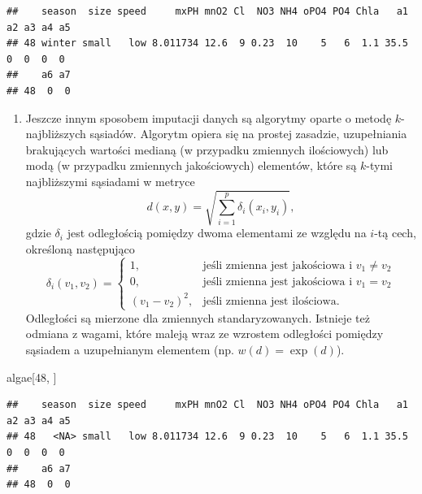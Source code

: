 \documentclass[
]{book}
\newenvironment{Shaded}{\begin{snugshade}}{\end{snugshade}}
\newcommand{\DecValTok}[1]{\textcolor[rgb]{0.00,0.00,0.81}{#1}}
\newcommand{\NormalTok}[1]{#1}
\providecommand{\tightlist}{%
  \setlength{\itemsep}{0pt}\setlength{\parskip}{0pt}}
\theoremstyle{plain}
\theoremstyle{definition}
\theoremstyle{definition}
\theoremstyle{definition}
\theoremstyle{definition}
\theoremstyle{definition}
\theoremstyle{remark}
\begin{document}
\begin{verbatim}
##    season  size speed     mxPH mnO2 Cl  NO3 NH4 oPO4 PO4 Chla   a1 a2 a3 a4 a5
## 48 winter small   low 8.011734 12.6  9 0.23  10    5   6  1.1 35.5  0  0  0  0
##    a6 a7
## 48  0  0
\end{verbatim}

\begin{enumerate}
\def\labelenumi{\arabic{enumi}.}
\setcounter{enumi}{3}
\tightlist
\item
  Jeszcze innym sposobem imputacji danych są algorytmy oparte o metodę \(k\)-najbliższych sąsiadów. Algorytm opiera się na prostej zasadzie, uzupełniania brakujących wartości medianą (w przypadku zmiennych ilościowych) lub modą (w przypadku zmiennych jakościowych) elementów, które są \(k\)-tymi najbliższymi sąsiadami w metryce
  \begin{equation}\label{knn}
   d(x,y)=\sqrt{\sum_{i=1}^{p}\delta_i(x_i,y_i)},
  \end{equation}
  gdzie \(\delta_i\) jest odległością pomiędzy dwoma elementami ze względu na \(i\)-tą cech, określoną następująco
  \begin{equation}\label{metryka}
   \delta_i(v_1, v_2)=\begin{cases}
       1,& \text{jeśli zmienna jest jakościowa i }v_1\neq v_2\\
       0,& \text{jeśli zmienna jest jakościowa i }v_1=v_2\\
       (v_1-v_2)^2,& \text{jeśli zmienna jest ilościowa.}
   \end{cases}
  \end{equation}
  Odległości są mierzone dla zmiennych standaryzowanych. Istnieje też odmiana z wagami, które maleją wraz ze wzrostem odległości pomiędzy sąsiadem a uzupełnianym elementem (np. \(w(d)=\exp(d)\)).
\end{enumerate}

\begin{Shaded}
\begin{Highlighting}[]
\NormalTok{algae[}\DecValTok{48}\NormalTok{, ]}
\end{Highlighting}
\end{Shaded}

\begin{verbatim}
##    season  size speed     mxPH mnO2 Cl  NO3 NH4 oPO4 PO4 Chla   a1 a2 a3 a4 a5
## 48   <NA> small   low 8.011734 12.6  9 0.23  10    5   6  1.1 35.5  0  0  0  0
##    a6 a7
## 48  0  0
\end{verbatim}
\end{document}
